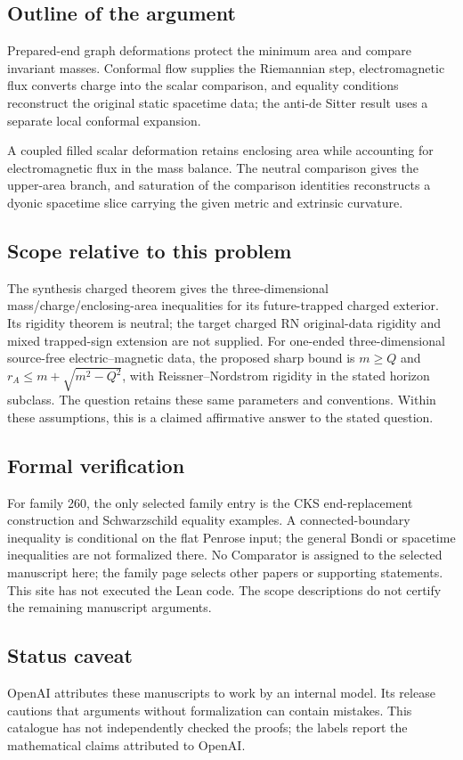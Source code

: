 \documentclass[11pt]{article}
\begin{document}
\subsection{Outline of the argument}
Prepared-end graph deformations protect the minimum area and compare invariant masses. Conformal flow supplies the Riemannian step, electromagnetic flux converts charge into the scalar comparison, and equality conditions reconstruct the original static spacetime data; the anti-de Sitter result uses a separate local conformal expansion.

A coupled filled scalar deformation retains enclosing area while accounting for electromagnetic flux in the mass balance. The neutral comparison gives the upper-area branch, and saturation of the comparison identities reconstructs a dyonic spacetime slice carrying the given metric and extrinsic curvature.

\subsection{Scope relative to this problem}
The synthesis charged theorem gives the three-dimensional mass/charge/enclosing-area inequalities for its future-trapped charged exterior. Its rigidity theorem is neutral; the target charged RN original-data rigidity and mixed trapped-sign extension are not supplied. For one-ended three-dimensional source-free electric--magnetic data, the proposed sharp bound is $m\geq Q$ and $r_A\leq m+\sqrt{m^2-Q^2}$, with Reissner--Nordstrom rigidity in the stated horizon subclass. The question retains these same parameters and conventions. Within these assumptions, this is a claimed affirmative answer to the stated question.

\subsection{Formal verification}
For family 260, the only selected family entry is the CKS end-replacement construction and Schwarzschild equality examples. A connected-boundary inequality is conditional on the flat Penrose input; the general Bondi or spacetime inequalities are not formalized there. No Comparator is assigned to the selected manuscript here; the family page selects other papers or supporting statements. This site has not executed the Lean code. The scope descriptions do not certify the remaining manuscript arguments.

\subsection{Status caveat}
OpenAI attributes these manuscripts to work by an internal model. Its release cautions that arguments without formalization can contain mistakes. This catalogue has not independently checked the proofs; the labels report the mathematical claims attributed to OpenAI.
\end{document}
